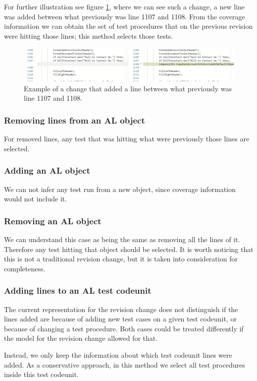 \documentclass{article}
\begin{document}
For further illustration see figure \ref{fig:addinglinechange}, where we can see such a change, a new line was added between what previously was line 1107 and 1108. From the coverage information we can obtain the set of test procedures that on the previous revision were hitting those lines; this method selects those tests.

\begin{figure}[H]
  \includegraphics[width=\textwidth]{images/addinglinechange.png}
  \caption{Example of a change that added a line between what previously was line 1107 and 1108.}\label{fig:erdiagram}
  \label{fig:addinglinechange}
\end{figure}

\subsubsection{Removing lines from an AL object}
For removed lines, any test that was hitting what were previously those lines are selected.
\subsubsection{Adding an AL object}
We can not infer any test run from a new object, since coverage information would not include it.
\subsubsection{Removing an AL object}
We can understand this case as being the same as removing all the lines of it. Therefore any test hitting that object should be selected. It is worth noticing that this is not a traditional revision change, but it is taken into consideration for completeness.
\subsubsection{Adding lines to an AL test codeunit}
The current representation for the revision change does not distinguish if the lines added are because of adding new test cases on a given test codeunit, or because of changing a test procedure. Both cases could be treated differently if the model for the revision change allowed for that.

Instead, we only keep the information about which test codeunit lines were added. As a conservative approach, in this method we select all test procedures inside this test codeunit.
\end{document}
